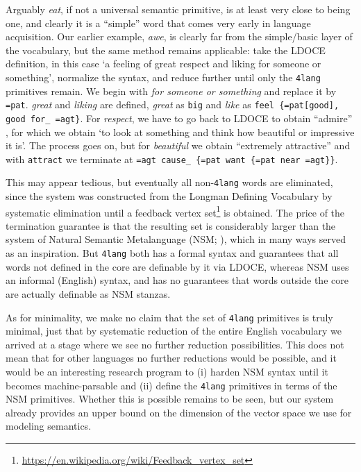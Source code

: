 \documentclass[output=paper,colorlinks=true,citecolor=brown]{langscibook}
\begin{document}
Arguably \textit{eat}, if not a universal semantic primitive, is at least very
close to being one, and clearly it is a ``simple'' word \citep{Kornai:2021} that
comes very early in language acquisition. Our earlier example, \textit{awe}, is
clearly far from the simple/basic layer of the vocabulary, but the same method
remains applicable: take the LDOCE definition, in this case `a feeling of
great respect and liking for someone or something', normalize the syntax, and
reduce further until only the \texttt{4lang} primitives remain. We begin with
\textit{for someone or something} and replace it by \texttt{=pat}. \textit{great}
and \textit{liking} are defined, \textit{great} as \texttt{big} and \textit{like} as \texttt{feel \{=pat[good], good for\_ =agt\}}. For \textit{respect}, we have to
go back to LDOCE to obtain ``admire'' , for which we obtain `to look at something
and think how beautiful or impressive it is'. The process goes on, but for
\textit{beautiful} we obtain “extremely attractive” and with \texttt{attract} we
terminate at \texttt{=agt cause\_ \{=pat want \{=pat near =agt\}\}}.

This may appear tedious, but eventually all non-\texttt{4lang} words are
eliminated, since the system was constructed from the Longman Defining
Vocabulary by systematic elimination \citep{Acs:2019b} until a
feedback vertex set\footnote{\url{https://en.wikipedia.org/wiki/Feedback_vertex_set}} is obtained. The price of the termination guarantee is that the resulting set
is considerably larger than the system of Natural Semantic Metalanguage
(NSM; \cite{Wierzbicka:1992,Wierzbicka:1996,Goddard:2002}), which in many ways
served as an inspiration. But \texttt{4lang} both has a formal syntax and
guarantees that all words not defined in the core are definable by it via
LDOCE, whereas NSM uses an informal (English) syntax, and has no guarantees
that words outside the core are actually definable as NSM stanzas.

As for minimality, we make no claim that the set of \texttt{4lang} primitives
is truly minimal, just that by systematic reduction of the entire English
vocabulary we arrived at a stage where we see no further reduction
possibilities.  This does not mean that for other languages no further
reductions would be possible, and it would be an interesting research program
to (i) harden NSM syntax until it becomes machine-parsable and (ii) define the
\texttt{4lang} primitives in terms of the NSM primitives. Whether this is
possible remains to be seen, but our system already provides an upper bound on
the dimension of the vector space we use for modeling semantics.
\end{document}
